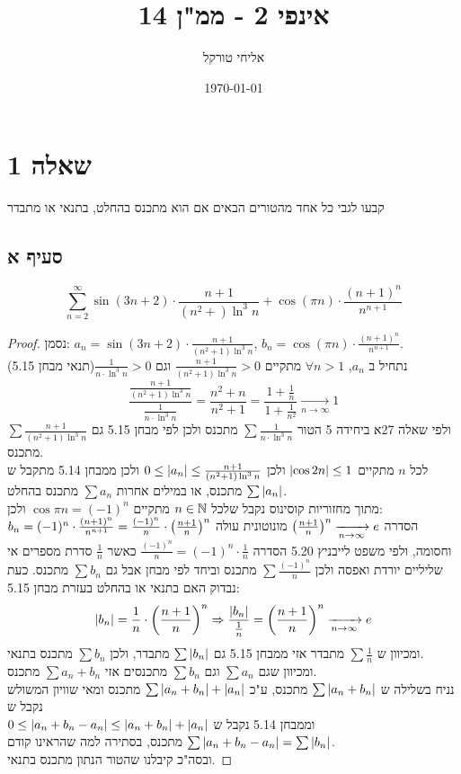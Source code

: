 \documentclass{article}
\title{אינפי 2 - ממ"ן 14}
\author{אליחי טורקל \ID}
\date\today
\begin{document}
	\maketitle %


	\section*{שאלה 1}
	קבעו לגבי כל אחד מהטורים הבאים אם הוא מתכנס בהחלט, בתנאי או מתבדר

	\subsection*{סעיף א}
	\[
		\sum^\infty_{n=2}\sin(3n+2) \cdot \frac{n + 1}{(n^2 + ) \ln^3 n} + \cos(\pi n) \cdot \frac{(n+1)^n}{n^{n+1}}
	\]
	\begin{proof}
		נסמן: $a_n = \sin(3n+2) \cdot \frac{n + 1}{(n^2 + 1) \ln^3 n}$, $b_n = \cos(\pi n) \cdot \frac{(n+1)^n}{n^{n+1}}$. \\
		נתחיל ב $a_n$, $\forall n > 1$ מתקיים $\frac{n + 1}{(n^2 + 1) \ln^3 n} > 0$ וגם $\frac{1}{n \cdot \ln^3 n} > 0$(תנאי מבחן 5.15)
		\[
		\frac{\frac{n + 1}{(n^2 + 1) \ln^3 n}}{\frac{1}{n \cdot \ln^3 n}}
		= \frac{n^2 + n}{n^2 + 1}
		= \frac{1 + \frac{1}{n}}{1 + \frac{1}{n^2}} \xrightarrow[n \to \infty]{} 1
		\]
		ולפי שאלה 27א ביחידה 5 הטור $\sum \frac{1}{n \cdot \ln^3 n}$ מתכנס
		ולכן לפי מבחן 5.15 גם $\sum \frac{n + 1}{(n^2 + 1) \ln^3 n}$ מתכנס. \\
		לכל $n$ מתקיים $\left| \cos 2n \right| \leq 1$ ולכן $0 \leq \left| a_n \right| \leq \frac{n + 1}{(n^2 + 1) \ln^3 n}$
		ולכן ממבחן 5.14 מתקבל ש $\sum \left| a_n \right|$ מתכנס, או במילים אחרות $\sum a_n$ מתכנס בהחלט. \\
		מתוך מחזוריות קוסינוס נקבל שלכל $n \in \mathbb{N}$ מתקיים $\cos \pi n = (-1)^n$
		ולכן: \\
		$b_n = (-1)^n \cdot \frac{(n+1)^n}{n^{n+1}} = \frac{(-1)^n}{n} \cdot \left( \frac{n+1}{n} \right)^n$
		הסדרה $\left( \frac{n+1}{n} \right)^n \xrightarrow[n \to \infty]{} e$ מונוטונית עולה וחסומה,
		ולפי משפט לייבניץ 5.20 הסדרה $\frac{(-1)^n}{n} = (-1)^n \cdot \frac{1}{n}$ כאשר $\frac{1}{n}$ סדרת מספרים אי שליליים יורדת ואפסה ולכן $\sum \frac{(-1)^n}{n}$ מתכנס
		וביחד לפי מבחן אבל גם $\sum b_n$ מתכנס.
		כעת נבדוק האם בתנאי או בהחלט בעזרת מבחן 5.15:
		\[
		\left| b_n \right| = \frac{1}{n} \cdot \left( \frac{n+1}{n} \right)^n \Rightarrow
		\frac{\left| b_n \right|}{\frac{1}{n}}
		= \left( \frac{n+1}{n} \right)^n \xrightarrow[n \to \infty]{} e
		\]
		ומכיוון ש $\sum \frac{1}{n}$ מתבדר אזי ממבחן 5.15 גם $\sum \left| b_n \right|$ מתבדר, ולכן $\sum b_n$ מתכנס בתנאי. \\
		ומכיוון שגם $\sum a_n$ וגם $\sum b_n$ מתכנסים אזי $\sum a_n + b_n$ מתכנס. \\
		נניח בשלילה ש $\sum \left| a_n + b_n \right|$ מתכנס, ע"כ $\sum \left| a_n + b_n \right| + \left| a_n \right|$ מתכנס
		ומאי שוויון המשולש נקבל ש \\
		 $0 \leq \left| a_n + b_n - a_n \right| \leq \left| a_n + b_n \right| + \left| a_n \right|$ וממבחן 5.14 נקבל ש $\sum \left| a_n + b_n - a_n \right| = \sum \left| b_n \right|$ מתכנס, בסתירה למה שהראינו קודם. \\
		ובסה"כ קיבלנו שהטור הנתון מתכנס בתנאי.
		\end{proof}
\end{document}
